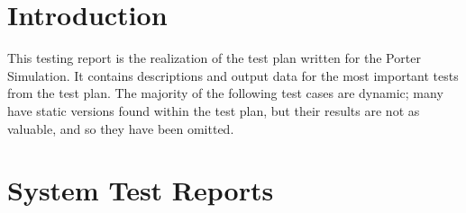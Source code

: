 \documentclass[paper=letter, fontsize=10pt]{scrartcl}
\numberwithin{equation}{section}		%
\numberwithin{figure}{section}			%
\numberwithin{table}{section}				%
\begin{document}
\section{Introduction}
This testing report is the realization of the test plan written for the Porter Simulation. It contains descriptions and output data for the most important tests from the test plan. The majority of the following test cases are dynamic; many have static versions found within the test plan, but their results are not as valuable, and so they have been omitted.

\section{System Test Reports}
\end{document}
